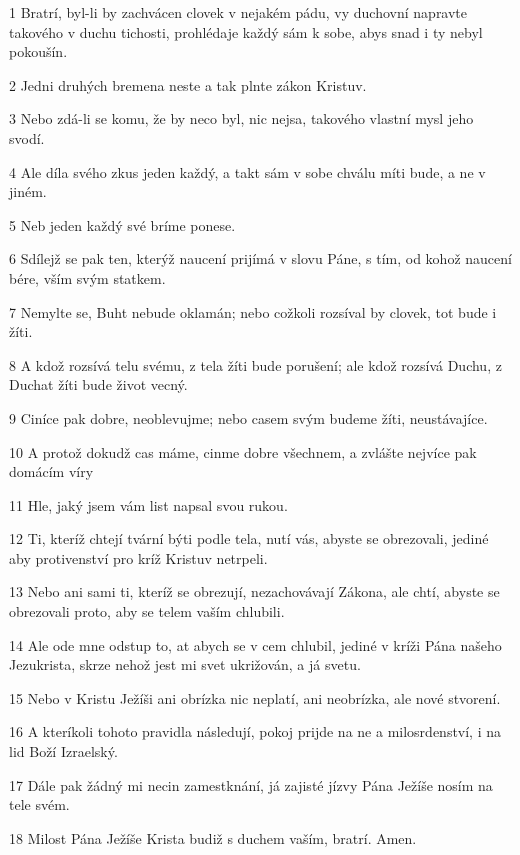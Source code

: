 \par 1 Bratrí, byl-li by zachvácen clovek v nejakém pádu, vy duchovní napravte takového v duchu tichosti, prohlédaje každý sám k sobe, abys snad i ty nebyl pokoušín.
\par 2 Jedni druhých bremena neste a tak plnte zákon Kristuv.
\par 3 Nebo zdá-li se komu, že by neco byl, nic nejsa, takového vlastní mysl jeho svodí.
\par 4 Ale díla svého zkus jeden každý, a takt sám v sobe chválu míti bude, a ne v jiném.
\par 5 Neb jeden každý své bríme ponese.
\par 6 Sdílejž se pak ten, kterýž naucení prijímá v slovu Páne, s tím, od kohož naucení bére, vším svým statkem.
\par 7 Nemylte se, Buht nebude oklamán; nebo cožkoli rozsíval by clovek, tot bude i žíti.
\par 8 A kdož rozsívá telu svému, z tela žíti bude porušení; ale kdož rozsívá Duchu, z Duchat žíti bude život vecný.
\par 9 Ciníce pak dobre, neoblevujme; nebo casem svým budeme žíti, neustávajíce.
\par 10 A protož dokudž cas máme, cinme dobre všechnem, a zvlášte nejvíce pak domácím víry
\par 11 Hle, jaký jsem vám list napsal svou rukou.
\par 12 Ti, kteríž chtejí tvární býti podle tela, nutí vás, abyste se obrezovali, jediné aby protivenství pro kríž Kristuv netrpeli.
\par 13 Nebo ani sami ti, kteríž se obrezují, nezachovávají Zákona, ale chtí, abyste se obrezovali proto, aby se telem vaším chlubili.
\par 14 Ale ode mne odstup to, at abych se v cem chlubil, jediné v kríži Pána našeho Jezukrista, skrze nehož jest mi svet ukrižován, a já svetu.
\par 15 Nebo v Kristu Ježíši ani obrízka nic neplatí, ani neobrízka, ale nové stvorení.
\par 16 A kteríkoli tohoto pravidla následují, pokoj prijde na ne a milosrdenství, i na lid Boží Izraelský.
\par 17 Dále pak žádný mi necin zamestknání, já zajisté jízvy Pána Ježíše nosím na tele svém.
\par 18 Milost Pána Ježíše Krista budiž s duchem vaším, bratrí. Amen.


